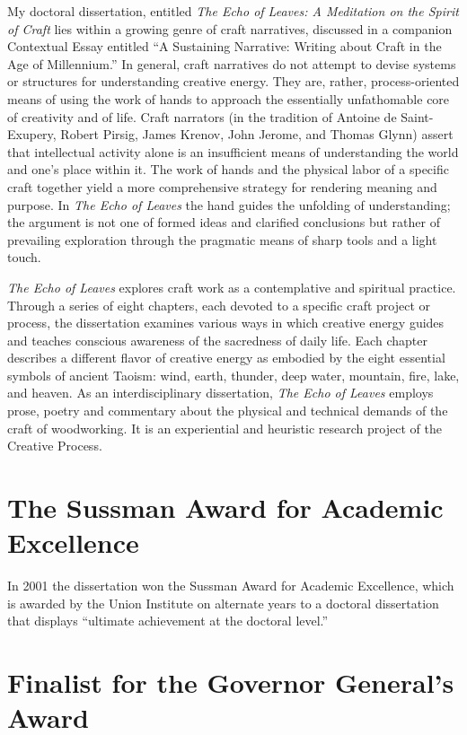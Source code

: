 \documentclass[10pt,DIV09,letterpaper,oneside,headsepline]{scrreprt}
\begin{document}
My doctoral dissertation, entitled \textit{The Echo of Leaves: A Meditation on the Spirit of Craft} lies within a growing genre of craft narratives, discussed in a companion Contextual Essay entitled ``A Sustaining Narrative: Writing about Craft in the Age of Millennium.'' In general, craft narratives do not attempt to devise systems or structures for understanding creative energy. They are, rather, process-oriented means of using the work of hands to approach the essentially unfathomable core of creativity and of life. Craft narrators (in the tradition of Antoine de Saint-Exupery, Robert Pirsig, James Krenov, John Jerome, and Thomas Glynn) assert that intellectual activity alone is an insufficient means of understanding the world and one's place within it. The work of hands and the physical labor of a specific craft together yield a more comprehensive strategy for rendering meaning and purpose. In \textit{The Echo of Leaves} the hand guides the unfolding of understanding; the argument is not one of formed ideas and clarified conclusions but rather of prevailing exploration through the pragmatic means of sharp tools and a light touch.

\textit{The Echo of Leaves} explores craft work as a contemplative and spiritual practice. Through a series of eight chapters, each devoted to a specific craft project or process, the dissertation examines various ways in which creative energy guides and teaches conscious awareness of the sacredness of daily life. Each chapter describes a different flavor of creative energy as embodied by the eight essential symbols of ancient Taoism: wind, earth, thunder, deep water, mountain, fire, lake, and heaven. As an interdisciplinary dissertation, \textit{The Echo of Leaves} employs prose, poetry and commentary about the physical and technical demands of the craft of woodworking. It is an experiential and heuristic research project of the Creative Process.

\section{The Sussman Award for Academic Excellence}

In 2001 the dissertation won the Sussman Award for Academic Excellence, which is awarded by the Union Institute on alternate years to a doctoral dissertation that displays ``ultimate achievement at the doctoral level.''

\section{Finalist for the Governor General's Award}
\end{document}
